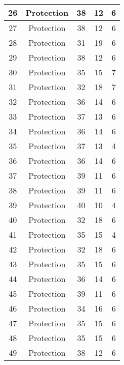 \documentclass[results.tex]{subfiles}
\begin{document}
\begin{center}
\begin{tabular}{| c || c | c | c | c |}
    \hline
    26 & Protection & 38 & 12 & 6 \\ 
    \hline
    27 & Protection & 38 & 12 & 6 \\ 
    \hline
    28 & Protection & 31 & 19 & 6 \\ 
    \hline
    29 & Protection & 38 & 12 & 6 \\ 
    \hline
    30 & Protection & 35 & 15 & 7 \\ 
    \hline
    31 & Protection & 32 & 18 & 7 \\ 
    \hline
    32 & Protection & 36 & 14 & 6 \\ 
    \hline
    33 & Protection & 37 & 13 & 6 \\ 
    \hline
    34 & Protection & 36 & 14 & 6 \\ 
    \hline
    35 & Protection & 37 & 13 & 4 \\ 
    \hline
    36 & Protection & 36 & 14 & 6 \\ 
    \hline
    37 & Protection & 39 & 11 & 6 \\ 
    \hline
    38 & Protection & 39 & 11 & 6 \\ 
    \hline
    39 & Protection & 40 & 10 & 4 \\ 
    \hline
    40 & Protection & 32 & 18 & 6 \\ 
    \hline
    41 & Protection & 35 & 15 & 4 \\ 
    \hline
    42 & Protection & 32 & 18 & 6 \\ 
    \hline
    43 & Protection & 35 & 15 & 6 \\ 
    \hline
    44 & Protection & 36 & 14 & 6 \\ 
    \hline
    45 & Protection & 39 & 11 & 6 \\ 
    \hline
    46 & Protection & 34 & 16 & 6 \\ 
    \hline
    47 & Protection & 35 & 15 & 6 \\ 
    \hline
    48 & Protection & 35 & 15 & 6 \\ 
    \hline
    49 & Protection & 38 & 12 & 6 \\ 
    \hline   \end{tabular}
\end{center}
\end{document}
